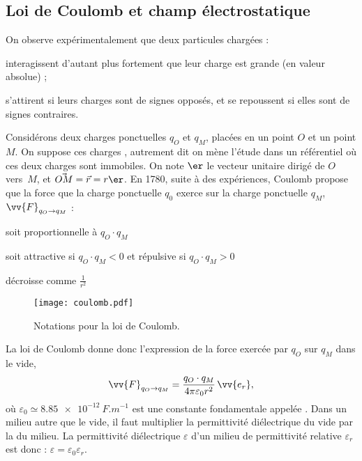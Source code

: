 \documentclass[12pt,fancy]{/Users/victor/Documents/COURS/2ACapECL/texmf/tex/latex/Preambles/cours}
\begin{document}
\subsection{Loi de Coulomb et champ électrostatique}
\label{subsec:coulomb_champ_electrostat}

 On observe expérimentalement que deux particules chargées :
\begin{liste}
\item interagissent d’autant plus fortement que leur charge est grande (en valeur absolue) ;
\item s’attirent si leurs charges sont de signes opposés, et se repoussent si elles sont de signes contraires.
\end{liste}

Considérons deux charges ponctuelles $q_O$ et $q_M$, placées en un point $O$ et un point $M$. On suppose ces charges , autrement dit on mène l'étude dans un référentiel où ces deux charges sont immobiles. On note $\er$ le vecteur unitaire dirigé de $O$ vers~$M$, et $\Vec{OM}=\Vec{r} = r \er$.
En 1780, suite à des expériences, Coulomb propose que la force que la charge ponctuelle $q_{0}$ exerce sur la charge ponctuelle $q_{M}$, $\vv{F}_{q_O\rightarrow q_M}$ :
\begin{liste}
\item soit proportionnelle à $q_O \cdot q_M$
\item soit attractive si $q_O \cdot q_M < 0 $ et répulsive si $q_O \cdot q_M > 0$
\item décroisse comme $\frac{1}{r^2}$
\end{liste}
\begin{figure}[]
\centering
\texttt{[image: coulomb.pdf]}
\caption{Notations pour la loi de Coulomb.}
\end{figure}

\noindent La loi de Coulomb donne donc l'expression de la force exercée par $q_O$ sur $q_{M}$ dans le vide, 
\begin{equation*}
\vv{F}_{q_O\rightarrow q_M}=\frac{q_O \cdot q_M}{4\pi\varepsilon_0 r^2}\,\vv{e_r},
\end{equation*}
où $\varepsilon_0\simeq\SI{8,85e-12}{F.m^{-1}}$ est une constante fondamentale appelée . Dans un milieu autre que le vide, il faut multiplier la permittivité diélectrique du vide par la  du milieu. La permittivité diélectrique $\varepsilon$ d'un milieu de permittivité relative $\varepsilon_{r}$ est donc : $\varepsilon = \varepsilon_{0} \varepsilon_{r}$. 
\end{document}
